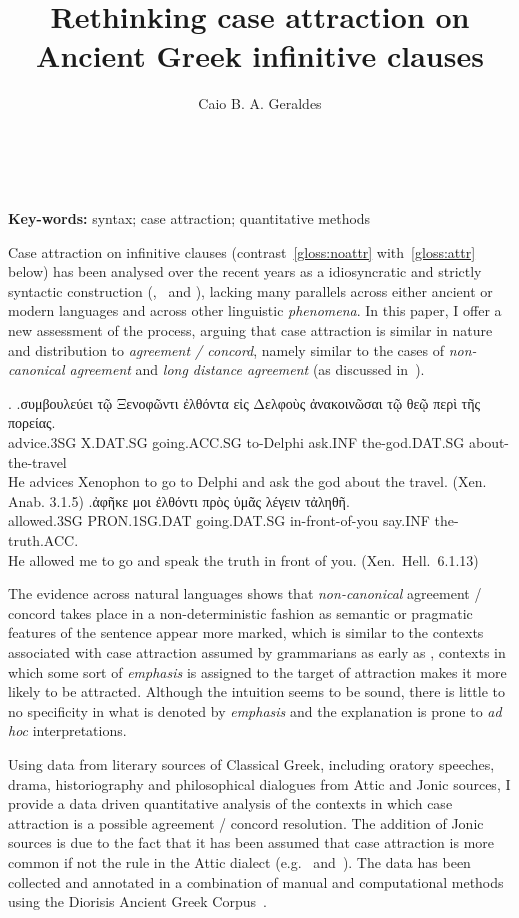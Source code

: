 \documentclass[article,a4paper,12pt]{memoir}
\title{Rethinking case attraction on Ancient Greek infinitive clauses}
\author{Caio B. A. Geraldes}
\begin{document}
\begin{center}
  {\large\textbf{\thetitle}}\\
  \bigskip
  \theauthor\\
  \bigskip
\noindent\textbf{Key-words:} syntax; case attraction; quantitative methods
\end{center}
  
Case attraction on infinitive clauses (contrast~\autoref{gloss:noattr}
with~\autoref{gloss:attr} below) has
been analysed over the recent years as a idiosyncratic and strictly
syntactic construction (\cite{Tantalou2003},~\cite{Spyropoulos2005} and 
\cites{Sevdali2013b}{Sevdali2013}), lacking many parallels across either 
ancient or modern languages and across other linguistic \emph{phenomena}. 
In this paper, I offer a new assessment of the process, arguing that case
attraction is similar in nature and distribution to \emph{agreement / concord},
namely similar to the cases of \emph{non-canonical agreement} and \emph{long 
distance agreement} (as discussed in~\cite{Corbett2006}).

\ex.
\ag.\label{gloss:noattr}συμβουλεύει {τῷ Ξενοφῶντι} ἐλθόντα {εἰς Δελφοὺς}
    ἀνακοινῶσαι {τῷ θεῷ} {περὶ τῆς πορείας}.\\
    advice.3SG X.DAT.SG going.ACC.SG to-Delphi ask.INF the-god.DAT.SG
    about-the-travel\\
    He advices Xenophon to go to Delphi and ask the god about the travel.
    (Xen. Anab. 3.1.5)
\bg.\label{gloss:attr}ἀφῆκε μοι ἐλθόντι {πρὸς ὑμᾶς} λέγειν τἀληθῆ.\\
    allowed.3SG PRON.1SG.DAT going.DAT.SG in-front-of-you say.INF
    the-truth.ACC.\\
    He allowed me to go and speak the truth in front of you. 
    (Xen.~Hell.~6.1.13)

The evidence across natural languages shows that \emph{non-canonical} agreement
\slash{} concord takes place in a non-deterministic fashion as semantic or
pragmatic features of the sentence appear more marked, which is similar to the
contexts associated with case attraction assumed by grammarians as early as
\textcite{Buttmann1826}, contexts in which some sort of \emph{emphasis} is
assigned to the target of attraction makes it more likely to be attracted.
Although the intuition seems to be sound, there is little to no specificity in 
what is denoted by \emph{emphasis} and the explanation is prone to \emph{ad hoc}
interpretations.

Using data from literary sources of Classical Greek, including oratory speeches,
drama, historiography and philosophical dialogues from Attic and Jonic sources,
I provide a data driven quantitative analysis of the contexts in which case
attraction is a possible agreement \slash{} concord resolution. The addition of
Jonic sources is due to the fact that it has been assumed that case attraction is
more common if not the rule in the Attic dialect
(e.g.~\cite[\emph{passim.}]{Buttmann1826} and~\cite[\emph{ad loc.}]{Cooper1997}).
The data has been collected and annotated in a combination of manual and
computational methods using the Diorisis Ancient Greek
Corpus~\parencite{TheDiorisisAncientGreekCorpus}.
\end{document}
